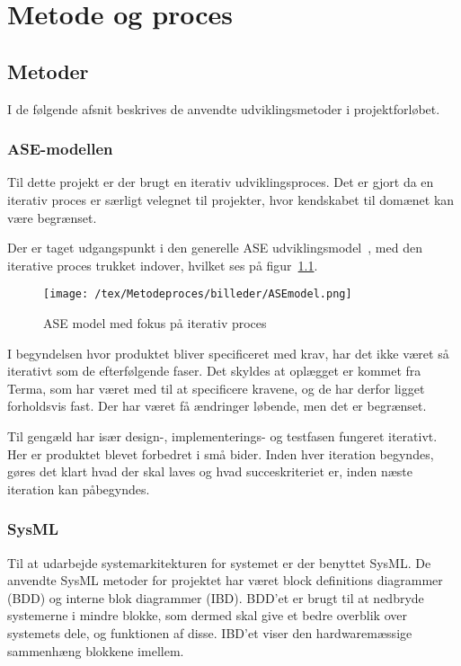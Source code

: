 \chapter{Metode og proces}

\section{Metoder}
I de følgende afsnit beskrives de anvendte udviklingsmetoder i projektforløbet.

\subsection{ASE-modellen}
Til dette projekt er der brugt en iterativ udviklingsproces. Det er gjort da en iterativ proces er særligt velegnet til projekter, hvor kendskabet til domænet kan være begrænset. 

Der er taget udgangspunkt i den generelle ASE udviklingsmodel~\cite{udviklingsproces}, med den iterative proces trukket indover, hvilket ses på figur~\ref{fig:ASE}.
\begin{figure}[H]
	\center
	\texttt{[image: /tex/Metodeproces/billeder/ASEmodel.png]}
	\caption{ASE model med fokus på iterativ proces}
	\label{fig:ASE}
\end{figure}  
\noindent I begyndelsen hvor produktet bliver specificeret med krav, har det ikke været så iterativt som de efterfølgende faser. Det skyldes at oplægget er kommet fra Terma, som har været med til at specificere kravene, og de har derfor ligget forholdsvis fast. Der har været få ændringer løbende, men det er begrænset.

Til gengæld har især design-, implementerings- og testfasen fungeret iterativt. Her er produktet blevet forbedret i små bider. Inden hver iteration begyndes, gøres det klart hvad der skal laves og hvad succeskriteriet er, inden næste iteration kan påbegyndes. 

\subsection{SysML}
Til at udarbejde systemarkitekturen for systemet er der benyttet SysML. De anvendte SysML metoder for projektet har været block definitions diagrammer (BDD) og interne blok diagrammer (IBD). BDD'et er brugt til at nedbryde systemerne i mindre blokke, som dermed skal give et bedre overblik over systemets dele, og funktionen af disse. IBD'et viser den hardwaremæssige sammenhæng blokkene imellem.    

